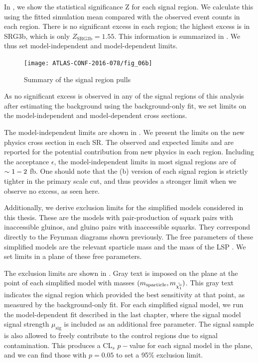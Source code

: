 In , we show the statistical significance Z for each signal region.
We calculate this using the fitted simulation mean compared with the observed event counts in each region.
There is no significant excess in each region; the highest excess is in SRG3b, which is only $Z_{\text{SRG3b}} = 1.55$.
This information is summarized in .
We thus set model-independent and model-dependent limits.

\begin{figure}[tbph]
\centering
\caption{Summary of the signal region pulls} \label{fig:sr_summary}
\texttt{[image: ATLAS-CONF-2016-078/fig\_06b]}
\end{figure}


As no significant excess is observed in any of the signal regions of this analysis after estimating the background using the background-only fit, we set limits on the model-independent and model-dependent cross sections.

The model-independent limits are shown in .
We present the limits on the new physics cross section in each SR.
The observed and expected limits \sobs and \sexp are reported for the potential contribution from new physics in each region.
Including the acceptance $\epsilon$, the model-independent limits in most signal regions are of $\sim 1-2$ fb.
One should note that the (b) version of each signal region is strictly tighter in the primary scale cut, and thus provides a stronger limit when we observe no excess, as seen here.

Additionally, we derive exclusion limits for the simplified models considered in this thesis.
These are the models with pair-production of squark pairs with inaccessible gluinos, and gluino pairs with inaccessible squarks.
They correspond directly to the Feynman diagrams shown previously.
The free parameters of these simplified models are the relevant sparticle mass and the mass of the LSP \lsp.
We set limits in a plane of these free parameters.

The exclusion limits are shown in .
Gray text is imposed on the plane at the point of each simplified model with masses $(m_{\mathrm{sparticle}}, m_{\tilde{\chi^0_1}})$.
This gray text indicates the signal region which provided the best sensitivity at that point, as measured by the background-only fit.
For each simplified signal model, we run the model-dependent fit described in the last chapter, where the signal model signal strength $\mu_{\mathrm{sig}}$ is included as an additional free parameter.
The signal sample is also allowed to freely contribute to the control regions due to signal contamination.
This produces a CL$_s$ $p-$value for each signal model in the plane, and we can find those with $p = 0.05$ to set a 95\% exclusion limit.

